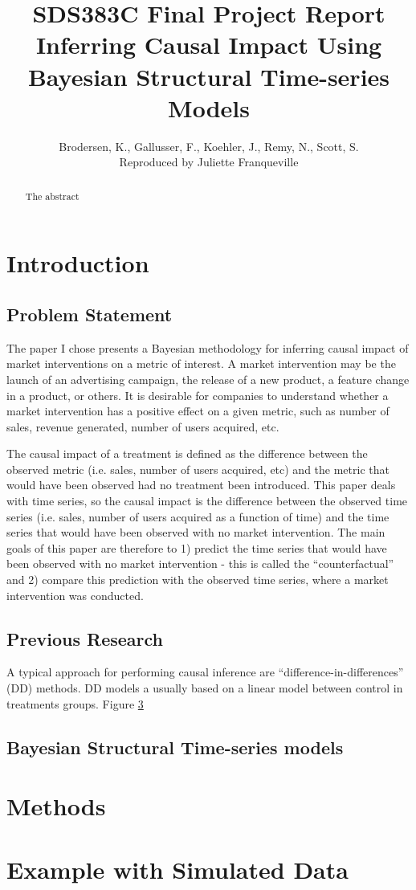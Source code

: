 \documentclass[12pt]{article}
\begin{document}
 
\title{SDS383C Final Project Report \\ \textbf{Inferring Causal Impact Using Bayesian Structural Time-series Models}} 
\author{Brodersen, K., Gallusser, F., Koehler, J., Remy, N., Scott, S.\\Reproduced by Juliette Franqueville
}
\maketitle

\begin{abstract}
    The abstract
\end{abstract}

\section{Introduction}
\subsection{Problem Statement}
The paper I chose  presents a Bayesian methodology for inferring causal impact of market interventions on a metric of interest. A market intervention may be the launch of an advertising campaign, the release of a new product, a feature change in a product, or others. It is desirable for companies to understand whether a market intervention has a positive effect on a given metric, such as number of sales, revenue generated, number of users acquired, etc. 

The causal impact of a treatment is defined as the difference between the observed metric (i.e. sales, number of users acquired, etc) and the metric that would have been observed had no treatment been introduced. This paper deals with time series, so the causal impact is the difference between the observed time series (i.e. sales, number of users acquired as a function of time) and the time series that would have been observed with no market intervention. The main goals of this paper are therefore to 1) predict the time series that would have been observed with no market intervention - this is called the ``counterfactual'' and 2) compare this prediction with the observed time series, where a market intervention was conducted.  

\subsection{Previous Research}
A typical approach for performing causal inference are ``difference-in-differences'' (DD) methods. DD models a usually based on a linear model between control in treatments groups. Figure \ref{}








\subsection{Bayesian Structural Time-series models}
\section{Methods}

\section{Example with Simulated Data}
\end{document}
